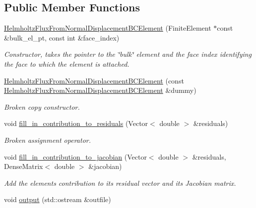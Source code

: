 \subsection*{Public Member Functions}
\begin{DoxyCompactItemize}
\item 
\hyperlink{classoomph_1_1HelmholtzFluxFromNormalDisplacementBCElement_ae37a7a8b5ad9850527f9285f2325aa2c}{Helmholtz\+Flux\+From\+Normal\+Displacement\+B\+C\+Element} (Finite\+Element $\ast$const \&bulk\+\_\+el\+\_\+pt, const int \&face\+\_\+index)
\begin{DoxyCompactList}\small\item\em Constructor, takes the pointer to the \char`\"{}bulk\char`\"{} element and the face index identifying the face to which the element is attached. \end{DoxyCompactList}\item 
\hyperlink{classoomph_1_1HelmholtzFluxFromNormalDisplacementBCElement_a5c093c485f9df81a14729f2ef41eced1}{Helmholtz\+Flux\+From\+Normal\+Displacement\+B\+C\+Element} (const \hyperlink{classoomph_1_1HelmholtzFluxFromNormalDisplacementBCElement}{Helmholtz\+Flux\+From\+Normal\+Displacement\+B\+C\+Element} \&dummy)
\begin{DoxyCompactList}\small\item\em Broken copy constructor. \end{DoxyCompactList}\item 
void \hyperlink{classoomph_1_1HelmholtzFluxFromNormalDisplacementBCElement_aab5bbb5d7c84d2aa0a5d9112e6f2d914}{fill\+\_\+in\+\_\+contribution\+\_\+to\+\_\+residuals} (Vector$<$ double $>$ \&residuals)
\begin{DoxyCompactList}\small\item\em Broken assignment operator. \end{DoxyCompactList}\item 
void \hyperlink{classoomph_1_1HelmholtzFluxFromNormalDisplacementBCElement_a5e10f6e632c05ce464548f51c8381b43}{fill\+\_\+in\+\_\+contribution\+\_\+to\+\_\+jacobian} (Vector$<$ double $>$ \&residuals, Dense\+Matrix$<$ double $>$ \&jacobian)
\begin{DoxyCompactList}\small\item\em Add the element\textquotesingle{}s contribution to its residual vector and its Jacobian matrix. \end{DoxyCompactList}\item 
void \hyperlink{classoomph_1_1HelmholtzFluxFromNormalDisplacementBCElement_a778e21256d01c8b51e4d9ab8e5767d5f}{output} (std\+::ostream \&outfile)

\end{DoxyCompactItemize}
